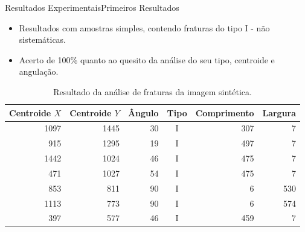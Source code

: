 \documentclass{beamer}
\begin{document}
\begin{frame}{Resultados Experimentais}{Primeiros Resultados}
    \begin{itemize}
    \item Resultados com amostras simples, contendo fraturas do tipo I - não sistemáticas.
    \item Acerto de 100\% quanto ao quesito da análise do seu tipo, centroide e angulação.
    \end{itemize}
    
        
    \begin{table}[!htb]
    \setlength{\tabcolsep}{2.0mm}
    \centering
    \caption{Resultado da análise de fraturas da imagem sintética.}
    \label{tab:resul_sintetico}
    \begin{tabular}{rrrcrr}
    \toprule
    Centroide $X$ & Centroide $Y$ & Ângulo & Tipo & Comprimento & Largura \\
    \midrule
    1097 & 1445 & 30 & I & 307 &   7 \\
     915 & 1295 & 19 & I & 497 &   7 \\
    1442 & 1024 & 46 & I & 475 &   7 \\
     471 & 1027 & 54 & I & 475 &   7 \\
     853 &  811 & 90 & I &   6 & 530 \\
    1113 &  773 & 90 & I &   6 & 574 \\
     397 &  577 & 46 & I & 459 &   7 \\
    \bottomrule
    \end{tabular}
    \end{table}
\end{frame}
\end{document}
